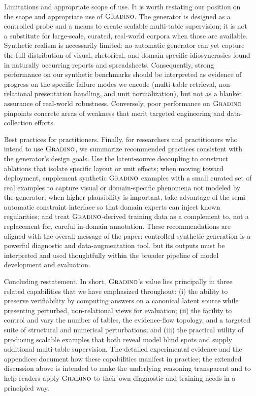 \documentclass[11pt]{article}
\newcommand{\name}{$\textsc{Gradino}$\xspace}
\begin{document}
Limitations and appropriate scope of use. It is worth restating our position on the scope and appropriate use of \name. The generator is designed as a controlled probe and a means to create scalable multi-table supervision; it is not a substitute for large-scale, curated, real-world corpora when those are available. Synthetic realism is necessarily limited: no automatic generator can yet capture the full distribution of visual, rhetorical, and domain-specific idiosyncrasies found in naturally occurring reports and spreadsheets. Consequently, strong performance on our synthetic benchmarks should be interpreted as evidence of progress on the specific failure modes we encode (multi-table retrieval, non-relational presentation handling, and unit normalization), but not as a blanket assurance of real-world robustness. Conversely, poor performance on \name{} pinpoints concrete areas of weakness that merit targeted engineering and data-collection efforts.

Best practices for practitioners. Finally, for researchers and practitioners who intend to use \name{}, we summarize recommended practices consistent with the generator's design goals. Use the latent-source decoupling to construct ablations that isolate specific layout or unit effects; when moving toward deployment, supplement synthetic \name{} examples with a small curated set of real examples to capture visual or domain-specific phenomena not modeled by the generator; when higher plausibility is important, take advantage of the semi-automatic constraint interface so that domain experts can inject known regularities; and treat \name{}-derived training data as a complement to, not a replacement for, careful in-domain annotation. These recommendations are aligned with the overall message of the paper: controlled synthetic generation is a powerful diagnostic and data-augmentation tool, but its outputs must be interpreted and used thoughtfully within the broader pipeline of model development and evaluation.

Concluding restatement. In short, \name{}'s value lies principally in three related capabilities that we have emphasized throughout: (i) the ability to preserve verifiability by computing answers on a canonical latent source while presenting perturbed, non-relational views for evaluation; (ii) the facility to control and vary the number of tables, the evidence-flow topology, and a targeted suite of structural and numerical perturbations; and (iii) the practical utility of producing scalable examples that both reveal model blind spots and supply additional multi-table supervision. The detailed experimental evidence and the appendices document how these capabilities manifest in practice; the extended discussion above is intended to make the underlying reasoning transparent and to help readers apply \name{} to their own diagnostic and training needs in a principled way.
\end{document}
